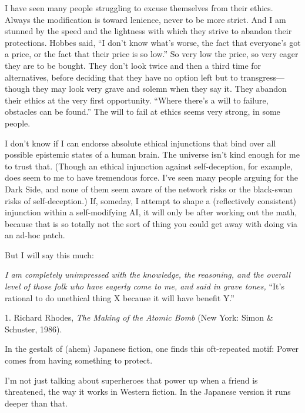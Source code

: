 {
 I have seen many people struggling to excuse themselves from their
ethics. Always the modification is toward lenience, never to be more
strict. And I am stunned by the speed and the lightness with which they
strive to abandon their protections. Hobbes said, ``I
don't know what's worse, the fact that
everyone's got a price, or the fact that their price is
so low.'' So very low the price, so very eager they
are to be bought. They don't look twice and then a
third time for alternatives, before deciding that they have no option
left but to transgress---though they may look very grave and solemn
when they say it. They abandon their ethics at the very first
opportunity. ``Where there's a will to
failure, obstacles can be found.'' The will to fail
at ethics seems very strong, in some people.}

{
 I don't know if I can endorse absolute ethical
injunctions that bind over all possible epistemic states of a human
brain. The universe isn't kind enough for me to trust
that. (Though an ethical injunction against self-deception, for
example, does seem to me to have tremendous force. I've
seen many people arguing for the Dark Side, and none of them seem aware
of the network risks or the black-swan risks of self-deception.) If,
someday, I attempt to shape a (reflectively consistent) injunction
within a self-modifying AI, it will only be after working out the math,
because that is so totally not the sort of thing you could get away
with doing via an ad-hoc patch.}

{
 But I will say this much:}

{
 \textit{I am completely unimpressed with the knowledge, the
reasoning, and the overall level of those folk who have eagerly come to
me, and said in grave tones,} ``It's
rational to do unethical thing X because it will have benefit
Y.''}

\myendsectiontext


\bigskip

{
 1. Richard Rhodes, \textit{The Making of the Atomic Bomb} (New
York: Simon \& Schuster, 1986).}


{
 In the gestalt of (ahem) Japanese fiction, one finds this
oft-repeated motif: Power comes from having something to protect. }

{
 I'm not just talking about superheroes that power
up when a friend is threatened, the way it works in Western fiction. In
the Japanese version it runs deeper than that.}

